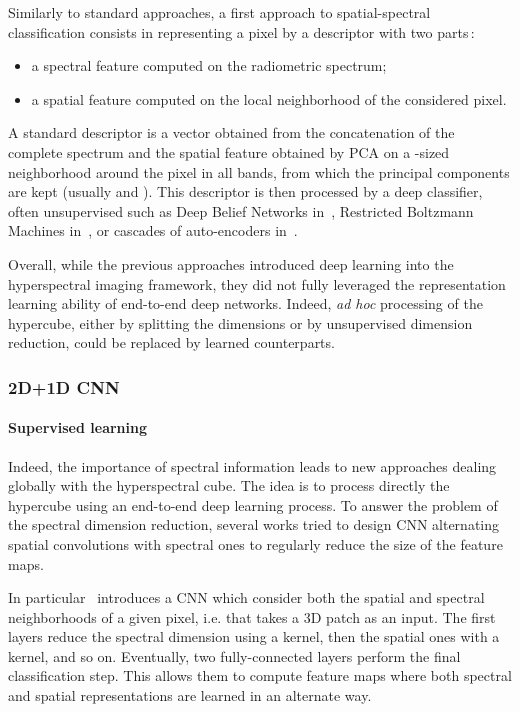 \documentclass[journal]{IEEEtran}
\begin{document}
Similarly to standard approaches, a first approach to spatial-spectral classification consists in representing a pixel by a descriptor with two parts\,:
\begin{itemize}
\item a spectral feature computed on the radiometric spectrum;
\item a spatial feature computed on the local neighborhood of the considered pixel.
\end{itemize}

A standard descriptor is a vector obtained from the concatenation of the complete spectrum and the spatial feature obtained by PCA on a -sized neighborhood around the pixel in all bands, from which the  principal components are kept (usually 
and ).
This descriptor is then processed by a deep classifier, often unsupervised such as Deep Belief Networks in~\cite{li_classification_2014,chen_spectral-spatial_2015}, Restricted Boltzmann Machines in~\cite{lin_spectral-spatial_2013,midhun_deep_2014}, or cascades of auto-encoders in~\cite{chen_deep_2014,ma_spectral-spatial_2016,tao_unsupervised_2015,wang_spectralspatial_2017}.

Overall, while the previous approaches introduced deep learning into the hyperspectral imaging framework, they did not fully leveraged the representation learning ability of end-to-end deep networks. Indeed, \emph{ad hoc} processing of the hypercube, either by splitting the dimensions or by unsupervised dimension reduction, could be replaced by learned counterparts.



\subsubsection{2D+1D CNN} 

\paragraph{Supervised learning} Indeed, the importance of spectral information leads to new approaches dealing globally with the hyperspectral cube. The idea is to process directly the hypercube using an end-to-end deep learning process. To answer the problem of the spectral dimension reduction, several works tried to design CNN alternating spatial convolutions with spectral ones to regularly reduce the size of the feature maps.

In particular~\cite{ben_hamida_deep_2016} introduces a CNN which consider both the spatial and spectral neighborhoods of a given pixel, i.e. that takes a 3D patch as an input. The first layers reduce the spectral dimension using a  kernel, then the spatial ones with a  kernel, and so on. Eventually, two fully-connected layers perform the final classification step. This allows them to compute feature maps where both spectral and spatial representations are learned in an alternate way.
\end{document}
